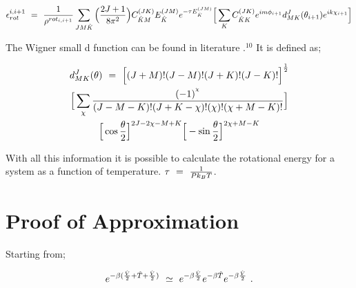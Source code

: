 \documentclass{ece}
\begin{document}
\begin{equation}
\epsilon_{rot}^{i, i+1} \hspace{0.125cm} = \hspace{0.125cm}  \frac{1}{\rho^{rot_{i, i+1}}} \sum_{J M \hat{K}} \Big( \frac{2 J + 1}{8 \pi^2} \Big) C_{\hat{K} M}^{(JK)} E_{\hat{K}}^{(JM)} e^{- \tau E_{\hat{K}}^{(JM)}} \Big[ \sum_{K} C_{\hat{K} K}^{(JK)} e^{i m \phi_{i+1}} d_{MK}^{J} (\theta_{i+1} )  e^{i k \chi_{i+1}} \Big]
\end{equation}

The Wigner small d function can be found in literature \begin{math}.^{10} \end{math} It is defined as;

\begin{multline*}
d_{MK}^{J} ( \theta ) \hspace{0.125cm} = \hspace{0.125cm}  \Big[ (J + M)! (J - M)! (J + K)! (J - K)! \Big]^{\frac{1}{2}} \\ \Big[ \sum_{\chi} \frac{(-1)^{^{\chi}}}{(J - M - K)!(J + K - \chi)! (\chi)! (\chi + M - K)!} \Big] \\ \Big[ \cos{ \frac{\theta}{2}} \Big]^{2J - 2 \chi - M + K} \Big[ - \sin{ \frac{\theta}{2}} \Big]^{2\chi + M - K}
\end{multline*}

With all this information it is possible to calculate the rotational energy for a system as a function of temperature. \begin{math} \tau \hspace{0.125cm} = \hspace{0.125cm} \frac{1}{P k_B T} \end{math}.

\section{Proof of Approximation}
\label{app:thrdappx}

Starting from;

\begin{equation} 
e^{-\beta ( \frac{\hat{V}}{2} + \hat{T} + \frac{\hat{V}}{2} )} \hspace{0.125cm} \simeq \hspace{0.125cm} e^{-\beta \frac{\hat{V}}{2}} e^{-\beta \hat{T}} e^{-\beta \frac{\hat{V}}{2}} \hspace{0.125cm} .
\end{equation}
\end{document}
